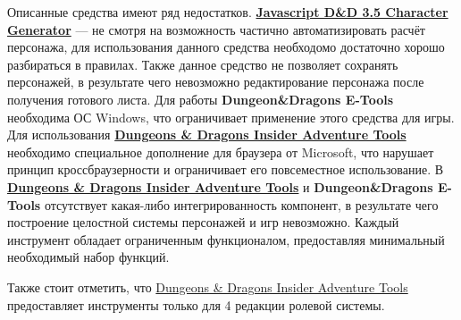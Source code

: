 Описанные средства имеют ряд недостатков.
\textbf{\href{http://www.pathguy.com/cg35.htm}{Javascript D\&D 3.5 Character Generator}} --- не смотря на возможность частично автоматизировать расчёт персонажа, для использования данного средства необходомо достаточно хорошо разбираться в правилах. Также данное средство не позволяет сохранять персонажей, в результате чего невозможно редактирование персонажа после получения готового листа.
Для работы \textbf{Dungeon\&Dragons E-Tools} необходима ОС Windows, что ограничивает применение этого средства для игры.
Для использования \textbf{\href{http://www.wizards.com/dnd/Tool.aspx?x=dnd/4new/tool/adventuretools}{Dungeons \& Dragons Insider Adventure Tools}} необходимо специальное дополнение для браузера от Microsoft, что нарушает принцип кроссбраузерности и ограничивает его повсеместное использование.
В \textbf{\href{http://www.wizards.com/dnd/Tool.aspx?x=dnd/4new/tool/adventuretools}{Dungeons \& Dragons Insider Adventure Tools}} и \textbf{Dungeon\&Dragons E-Tools} отсутствует какая-либо интегрированность компонент, в результате чего построение целостной системы персонажей и игр невозможно. Каждый инструмент обладает ограниченным функционалом, предоставляя минимальный необходимый набор функций.

Также стоит отметить, что \href{http://www.wizards.com/dnd/Tool.aspx?x=dnd/4new/tool/adventuretools}{Dungeons \& Dragons Insider Adventure Tools} предоставляет инструменты только для 4 редакции ролевой системы.
